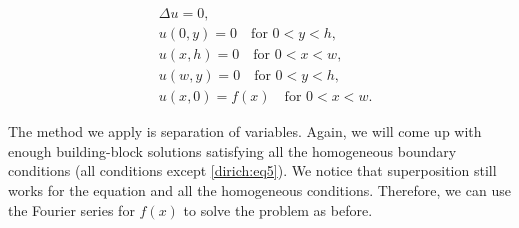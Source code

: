 \documentclass[12pt]{book}
\begin{document}
\begin{center}
\begin{minipage}[b]{2.6in}
\vspace{\fill}
\begin{align}
& \Delta u = 0 , \label{dirich:eq1} \\
& u(0,y) = 0 \quad \text{for }  0 < y < h,\label{dirich:eq2} \\
& u(x,h) = 0 \quad \text{for }  0 < x < w,\label{dirich:eq3} \\
& u(w,y) = 0 \quad \text{for }  0 < y < h,\label{dirich:eq4} \\
& u(x,0) = f(x) \quad \text{for }  0 < x < w.\label{dirich:eq5}
\end{align}
\vspace{\fill}
\end{minipage}
\qquad
\qquad
\end{center}

The method we apply is separation of variables.  Again, we will
come up with enough building-block
solutions satisfying all the homogeneous boundary conditions
(all conditions except \eqref{dirich:eq5}).  We notice that superposition
still works for the equation and all the homogeneous conditions.
Therefore,
we can use the Fourier series for $f(x)$ to solve the
problem as before.
\end{document}
